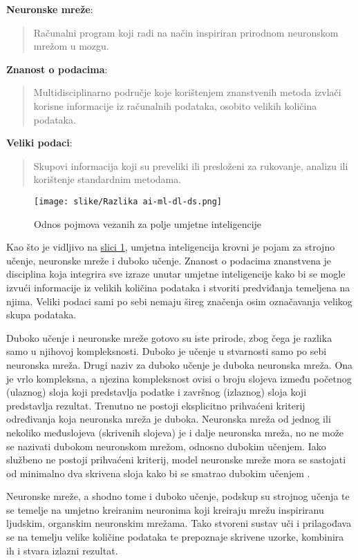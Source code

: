 \documentclass[]{foi} %
\begin{document}
\textbf{Neuronske mreže}: \blockquote[{\cite{NNBrit}}]{Računalni program koji radi na način inspiriran prirodnom neuronskom mrežom u mozgu.}

\textbf{Znanost o podacima}: \blockquote[{\cite{DSCamb}}]{Multidisciplinarno područje koje korištenjem znanstvenih metoda izvlači korisne informacije iz računalnih podataka, osobito velikih količina podataka.} 

\textbf{Veliki podaci}: \blockquote[{\cite{BDOx}}]{Skupovi informacija koji su preveliki ili presloženi za rukovanje, analizu ili korištenje standardnim metodama.}

\begin{figure}[H]
    \centering
    \texttt{[image: slike/Razlika ai-ml-dl-ds.png]}
    \caption{Odnos pojmova vezanih za polje umjetne inteligencije}
\end{figure}
\label{img: slika 1}

Kao što je vidljivo na \hyperref[img: slika 1]{slici 1}, umjetna inteligencija krovni je pojam za strojno učenje, neuronske mreže i duboko učenje. Znanost o podacima znanstvena je disciplina koja integrira sve izraze unutar umjetne inteligencije kako bi se mogle izvući informacije iz velikih količina podataka i stvoriti predviđanja temeljena na njima. Veliki podaci sami po sebi nemaju šireg značenja osim označavanja velikog skupa podataka.

Duboko učenje i neuronske mreže gotovo su iste prirode, zbog čega je razlika samo u njihovoj kompleksnosti. Duboko je učenje u stvarnosti samo po sebi neuronska mreža. Drugi naziv za duboko učenje je duboka neuronska mreža. Ona je vrlo kompleksna, a njezina kompleksnost ovisi o broju slojeva između početnog (ulaznog) sloja koji predstavlja podatke i završnog (izlaznog) sloja koji predstavlja rezultat. Trenutno ne postoji eksplicitno prihvaćeni kriterij određivanja koja neuronska mreža je duboka. Neuronska mreža od jednog ili nekoliko međuslojeva (skrivenih slojeva) je i dalje neuronska mreža, no ne može se nazivati dubokom neuronskom mrežom, odnosno dubokim učenjem. Iako službeno ne postoji prihvaćeni kriterij, model neuronske mreže mora se sastojati od minimalno dva skrivena sloja kako bi se smatrao dubokim učenjem \cite[str. 660]{AIforGames}.

Neuronske mreže, a shodno tome i duboko učenje, podskup su strojnog učenja te se temelje na umjetno kreiranim neuronima koji kreiraju mrežu inspiriranu ljudskim, organskim neuronskim mrežama. Tako stvoreni sustav uči i prilagođava se na temelju velike količine podataka te prepoznaje skrivene uzorke, kombinira ih i stvara izlazni rezultat. 
\end{document}
